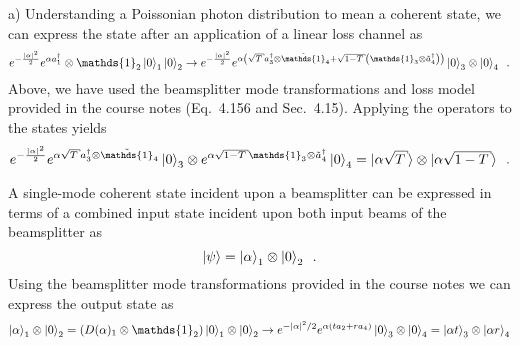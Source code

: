 \begin{homeworkProblem}
    \begin{homeworkSection}{a)}
        Understanding a Poissonian photon distribution to mean a coherent state,
        we can express the state after an application of a linear loss channel
        as
        \[
            e^{-\frac{\left| \alpha \right|^2}{2}} e^{\alpha a_1^\dagger } \otimes
            \mathds{1}_2
            \ket{0}_{1} \ket{0}_{2}
            \to e^{-\frac{\left| \alpha \right|^2}{2}} e^{\alpha \left(
                    \sqrt{T} a^\dagger_3 \otimes \tilde{\mathds{1}}_4 +
                    \sqrt{1-T} \left( \mathds{1}_3
                \otimes \tilde{a}^\dagger_4 \right) \right)} \ket{0}_3 \otimes
                \ket{0}_4 \enskip.
        \]
        Above, we have used the beamsplitter mode transformations and loss model
        provided in the course notes (Eq.~4.156 and Sec.~4.15). Applying the
        operators to the states yields
        \[
            e^{-\frac{\left| \alpha \right|^2}{2}} e^{\alpha \sqrt{T}
            a^\dagger_3 \otimes \tilde{\mathds{1}}_4} \ket{0}_3
            \otimes
            e^{\alpha \sqrt{1-T} \mathds{1}_3 \otimes \tilde{a}^\dagger_4 }
            \ket{0}_4 = \ket{\alpha \sqrt{T}} \otimes \ket{\alpha \sqrt{1-T}} \enskip.
        \]
    \end{homeworkSection}
    \begin{homeworkSection}
        A single-mode coherent state incident upon a beamsplitter can be
        expressed in terms of a combined input state incident upon both input
        beams of the beamsplitter as
        \[
            \ket{\psi} = \ket{\alpha}_1 \otimes \ket{0}_2 \enskip.
        \]
        Using the beamsplitter mode transformations provided in the course notes
        we can express the output state as
        \[
            \ket{\alpha}_1 \otimes \ket{0}_2 = (D(\alpha)_1 \otimes \mathds{1}_2) \ket{0}_1 \otimes
            \ket{0}_2 \to e^{-\left| \alpha \right|^2/2} e^{\alpha \left( t a_2
            + r a_4 \right)} \ket{0}_3 \otimes \ket{0}_4
            = \ket{\alpha t}_3 \otimes \ket{\alpha r}_4
        \]
    \end{homeworkSection}
\end{homeworkProblem}
